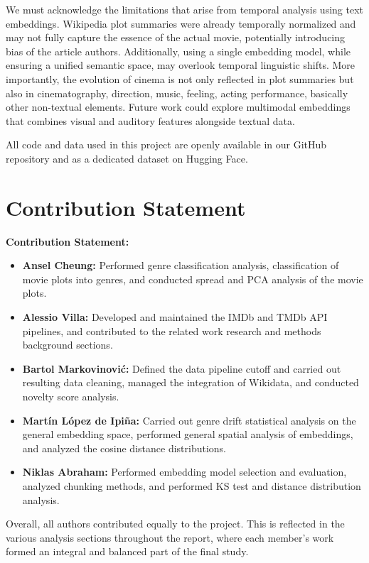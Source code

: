 \documentclass{article}
\begin{document}
We must acknowledge the limitations that arise from temporal analysis using text embeddings. Wikipedia plot summaries were already temporally normalized and may not fully capture the essence of the actual movie, potentially introducing bias of the article authors. Additionally, using a single embedding model, while ensuring a unified semantic space, may overlook temporal linguistic shifts. More importantly, the evolution of cinema is not only reflected in plot summaries but also in cinematography, direction, music, feeling, acting performance, basically other non-textual elements. Future work could explore multimodal embeddings that combines visual and auditory features alongside textual data.

All code and data used in this project are openly available in our GitHub repository\cite{our_github_repo} and as a dedicated dataset on Hugging Face\cite{our_data_on_huggingface}.

\clearpage

\section*{Contribution Statement}
\textbf{Contribution Statement:}

\begin{itemize}
    \item \textbf{Ansel Cheung:} Performed genre classification analysis, classification of movie plots into genres, and conducted spread and PCA analysis of the movie plots.
    \item \textbf{Alessio Villa:} Developed and maintained the IMDb and TMDb API pipelines, and contributed to the related work research and methods background sections.
    \item \textbf{Bartol Markovinović:} Defined the data pipeline cutoff and carried out resulting data cleaning, managed the integration of Wikidata, and conducted novelty score analysis.
    \item \textbf{Martín López de Ipiña:} Carried out genre drift statistical analysis on the general embedding space, performed general spatial analysis of embeddings, and analyzed the cosine distance distributions.
    \item \textbf{Niklas Abraham:} Performed embedding model selection and evaluation, analyzed chunking methods, and performed KS test and distance distribution analysis.
\end{itemize}

\vspace{0.5em}
Overall, all authors contributed equally to the project. This is reflected in the various analysis sections throughout the report, where each member's work formed an integral and balanced part of the final study.




    
\end{document}

